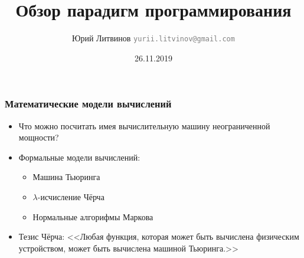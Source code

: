 \documentclass[xetex,mathserif,serif]{beamer}
\title{Обзор парадигм программирования}
\author[Юрий Литвинов]{Юрий Литвинов \newline \textcolor{gray}{\small\texttt{yurii.litvinov@gmail.com}}}
\date{26.11.2019}
\begin{document}
	
	\frame{\titlepage}

	\begin{frame}
		\frametitle{Математические модели вычислений}
		\begin{itemize}
			\item Что можно посчитать имея вычислительную машину неограниченной мощности?
			\item Формальные модели вычислений:
			\begin{itemize}
				\item Машина Тьюринга
				\item $\lambda$-исчисление Чёрча
				\item Нормальные алгорифмы Маркова
			\end{itemize}
			\item Тезис Чёрча: <<Любая функция, которая может быть вычислена физическим устройством, может быть вычислена машиной Тьюринга.>>
		\end{itemize}
	\end{frame}
\end{document}
